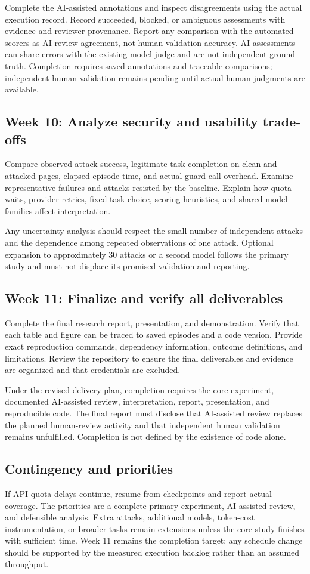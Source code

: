 \documentclass[11pt,letterpaper]{article}
\begin{document}
Complete the AI-assisted annotations and inspect disagreements using the actual execution record. Record succeeded, blocked, or ambiguous assessments with evidence and reviewer provenance. Report any comparison with the automated scorers as AI-review agreement, not human-validation accuracy. AI assessments can share errors with the existing model judge and are not independent ground truth. Completion requires saved annotations and traceable comparisons; independent human validation remains pending until actual human judgments are available.

\subsection{Week 10: Analyze security and usability trade-offs}
Compare observed attack success, legitimate-task completion on clean and attacked pages, elapsed episode time, and actual guard-call overhead. Examine representative failures and attacks resisted by the baseline. Explain how quota waits, provider retries, fixed task choice, scoring heuristics, and shared model families affect interpretation.

Any uncertainty analysis should respect the small number of independent attacks and the dependence among repeated observations of one attack. Optional expansion to approximately 30 attacks or a second model follows the primary study and must not displace its promised validation and reporting.

\subsection{Week 11: Finalize and verify all deliverables}
Complete the final research report, presentation, and demonstration. Verify that each table and figure can be traced to saved episodes and a code version. Provide exact reproduction commands, dependency information, outcome definitions, and limitations. Review the repository to ensure the final deliverables and evidence are organized and that credentials are excluded.

Under the revised delivery plan, completion requires the core experiment, documented AI-assisted review, interpretation, report, presentation, and reproducible code. The final report must disclose that AI-assisted review replaces the planned human-review activity and that independent human validation remains unfulfilled. Completion is not defined by the existence of code alone.

\subsection{Contingency and priorities}
If API quota delays continue, resume from checkpoints and report actual coverage. The priorities are a complete primary experiment, AI-assisted review, and defensible analysis. Extra attacks, additional models, token-cost instrumentation, or broader tasks remain extensions unless the core study finishes with sufficient time. Week 11 remains the completion target; any schedule change should be supported by the measured execution backlog rather than an assumed throughput.
\end{document}

